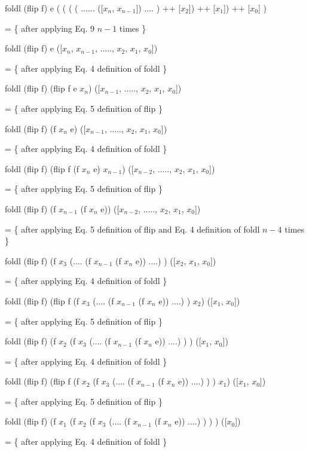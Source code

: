 \documentclass[twocolumn]{article}
\begin{document}
	 foldl (flip f) e ( ( ( ( ...... ([$x_{n}$, $x_{n-1}$]) .... ) ++ [$x_{2}$]) ++ [$x_{1}$]) ++ [$x_{0}$] )

	 = \{ after applying Eq. 9 $n - 1$ times \}
	 
	 foldl (flip f) e ([$x_{n}$, $x_{n-1}$, ....., $x_{2}$, $x_{1}$, $x_{0}$])
	 
	 = \{ after applying Eq. 4 definition of foldl \}
	 
	 foldl (flip f) (flip f e $x_{n}$) ([$x_{n-1}$, ....., $x_{2}$, $x_{1}$, $x_{0}$])
	 
	 = \{ after applying Eq. 5 definition of flip \}
	 
	 foldl (flip f) (f $x_{n}$ e) ([$x_{n-1}$, ....., $x_{2}$, $x_{1}$, $x_{0}$])
	 
	 = \{ after applying Eq. 4 definition of foldl \}
	 
	 foldl (flip f) (flip f (f $x_{n}$ e) $x_{n-1}$) ([$x_{n-2}$, ....., $x_{2}$, $x_{1}$, $x_{0}$])
	 
	 = \{ after applying Eq. 5 definition of flip \}
	 
	 foldl (flip f) (f $x_{n-1}$ (f $x_{n}$ e)) ([$x_{n-2}$, ....., $x_{2}$, $x_{1}$, $x_{0}$])
	 
	 = \{ after applying Eq. 5 definition of flip and Eq. 4 definition of foldl $n - 4$ times \}
	 
	 foldl (flip f) (f $x_{3}$ (.... (f $x_{n-1}$ (f $x_{n}$ e)) ....) ) ([$x_{2}$, $x_{1}$, $x_{0}$])

	 = \{ after applying Eq. 4 definition of foldl \}
	 
	 foldl (flip f) (flip f (f $x_{3}$ (.... (f $x_{n-1}$ (f $x_{n}$ e)) ....) ) $x_{2}$) ([$x_{1}$, $x_{0}$])

	 = \{ after applying Eq. 5 definition of flip \}
	 
	 foldl (flip f) (f $x_{2}$ (f $x_{3}$ (.... (f $x_{n-1}$ (f $x_{n}$ e)) ....) ) ) ([$x_{1}$, $x_{0}$])

	 = \{ after applying Eq. 4 definition of foldl \}
	 
	 foldl (flip f) (flip f (f $x_{2}$ (f $x_{3}$ (.... (f $x_{n-1}$ (f $x_{n}$ e)) ....) ) ) $x_{1}$) ([$x_{1}$, $x_{0}$])

	 = \{ after applying Eq. 5 definition of flip \}
	 
	 foldl (flip f) (f $x_{1}$ (f $x_{2}$ (f $x_{3}$ (.... (f $x_{n-1}$ (f $x_{n}$ e)) ....) ) ) ) ([$x_{0}$])

	 = \{ after applying Eq. 4 definition of foldl \}
	 
\end{document}
